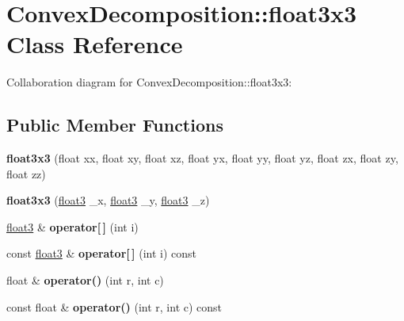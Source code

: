 \hypertarget{class_convex_decomposition_1_1float3x3}{\section{Convex\+Decomposition\+:\+:float3x3 Class Reference}
\label{class_convex_decomposition_1_1float3x3}
}


Collaboration diagram for Convex\+Decomposition\+:\+:float3x3\+:
\subsection*{Public Member Functions}
\begin{DoxyCompactItemize}
\item 
\hypertarget{class_convex_decomposition_1_1float3x3_a0a9f384b4e82c58f81de679c72ead914}{{\bfseries float3x3} (float xx, float xy, float xz, float yx, float yy, float yz, float zx, float zy, float zz)}\label{class_convex_decomposition_1_1float3x3_a0a9f384b4e82c58f81de679c72ead914}

\item 
\hypertarget{class_convex_decomposition_1_1float3x3_a53ec81de593e71acc861d9309742f06a}{{\bfseries float3x3} (\hyperlink{class_convex_decomposition_1_1float3}{float3} \+\_\+x, \hyperlink{class_convex_decomposition_1_1float3}{float3} \+\_\+y, \hyperlink{class_convex_decomposition_1_1float3}{float3} \+\_\+z)}\label{class_convex_decomposition_1_1float3x3_a53ec81de593e71acc861d9309742f06a}

\item 
\hypertarget{class_convex_decomposition_1_1float3x3_a7fb67e307ff16167aa621c4552c0226d}{\hyperlink{class_convex_decomposition_1_1float3}{float3} \& {\bfseries operator\mbox{[}$\,$\mbox{]}} (int i)}\label{class_convex_decomposition_1_1float3x3_a7fb67e307ff16167aa621c4552c0226d}

\item 
\hypertarget{class_convex_decomposition_1_1float3x3_afbf50be3e8298e78ff8273a361ae795a}{const \hyperlink{class_convex_decomposition_1_1float3}{float3} \& {\bfseries operator\mbox{[}$\,$\mbox{]}} (int i) const }\label{class_convex_decomposition_1_1float3x3_afbf50be3e8298e78ff8273a361ae795a}

\item 
\hypertarget{class_convex_decomposition_1_1float3x3_a02e1c7a6578ee8cc161f3ab03aa77be5}{float \& {\bfseries operator()} (int r, int c)}\label{class_convex_decomposition_1_1float3x3_a02e1c7a6578ee8cc161f3ab03aa77be5}

\item 
\hypertarget{class_convex_decomposition_1_1float3x3_a7d3fc7d95f703bb333346ae195cf3f49}{const float \& {\bfseries operator()} (int r, int c) const }\label{class_convex_decomposition_1_1float3x3_a7d3fc7d95f703bb333346ae195cf3f49}

\end{DoxyCompactItemize}
